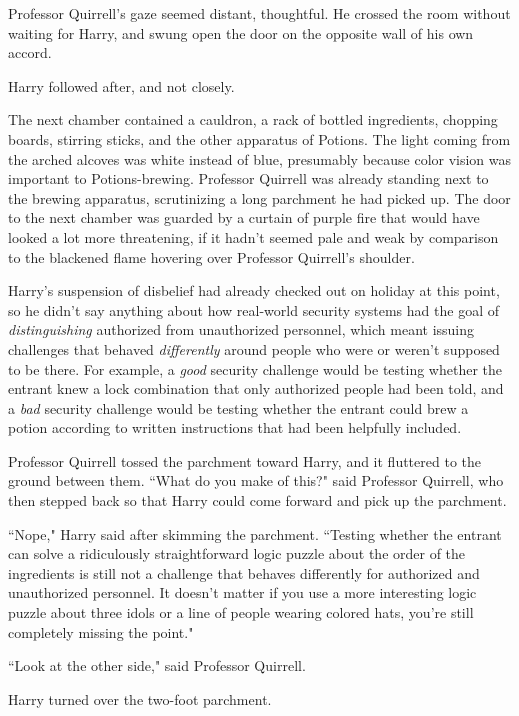 Professor Quirrell's gaze seemed distant, thoughtful. He crossed the room without waiting for Harry, and swung open the door on the opposite wall of his own accord.

Harry followed after, and not closely.

\later

The next chamber contained a cauldron, a rack of bottled ingredients, chopping boards, stirring sticks, and the other apparatus of Potions. The light coming from the arched alcoves was white instead of blue, presumably because color vision was important to Potions-brewing. Professor Quirrell was already standing next to the brewing apparatus, scrutinizing a long parchment he had picked up. The door to the next chamber was guarded by a curtain of purple fire that would have looked a lot more threatening, if it hadn't seemed pale and weak by comparison to the blackened flame hovering over Professor Quirrell's shoulder.

Harry's suspension of disbelief had already checked out on holiday at this point, so he didn't say anything about how real-world security systems had the goal of \emph{distinguishing} authorized from unauthorized personnel, which meant issuing challenges that behaved \emph{differently} around people who were or weren't supposed to be there. For example, a \emph{good} security challenge would be testing whether the entrant knew a lock combination that only authorized people had been told, and a \emph{bad} security challenge would be testing whether the entrant could brew a potion according to written instructions that had been helpfully included.

Professor Quirrell tossed the parchment toward Harry, and it fluttered to the ground between them. ``What do you make of this?" said Professor Quirrell, who then stepped back so that Harry could come forward and pick up the parchment.

``Nope," Harry said after skimming the parchment. ``Testing whether the entrant can solve a ridiculously straightforward logic puzzle about the order of the ingredients is still not a challenge that behaves differently for authorized and unauthorized personnel. It doesn't matter if you use a more interesting logic puzzle about three idols or a line of people wearing colored hats, you're still completely missing the point."

``Look at the other side," said Professor Quirrell.

Harry turned over the two-foot parchment.

